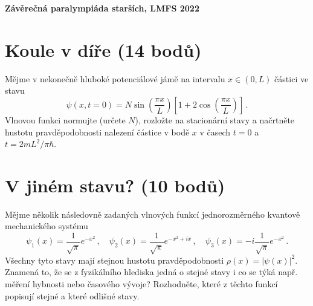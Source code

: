 \documentclass[10pt,a4paper,landscape]{article}
\author{Ondřej Zelenka}
\begin{document}
\pagestyle{empty}
\textbf{\center\LARGE Závěrečná paralympiáda starších, LMFS 2022}

\begin{multicols}{2}[]

\section{Koule v díře (14 bodů)}
Mějme v nekonečně hluboké potenciálové jámě na intervalu $x\in\left(0, L\right)$ částici ve stavu
\begin{equation}
\psi\left(x, t=0\right) = N\sin\left(\frac{\pi x}{L}\right)\left[1 + 2\cos\left(\frac{\pi x}{L}\right)\right] \,.
\end{equation}
Vlnovou funkci normujte (určete $N$), rozložte na stacionární stavy a načrtněte hustotu pravděpodobnosti nalezení částice v bodě $x$ v časech $t = 0$ a $t = 2mL^2/\pi\hbar$.

\section{V jiném stavu? (10 bodů)}
Mějme několik následovně zadaných vlnových funkcí jednorozměrného kvantově mechanického systému
\begin{equation}
\psi_1\left(x\right) = \frac{1}{\sqrt{\pi}}e^{-x^2} \,,\quad \psi_2\left(x\right) = \frac{1}{\sqrt{\pi}}e^{-x^2+ix} \,,\quad \psi_3\left(x\right) = -i\frac{1}{\sqrt{\pi}}e^{-x^2} \,.
\end{equation}
Všechny tyto stavy mají stejnou hustotu pravděpodobnosti $\rho\left(x\right) = \left|\psi\left(x\right)\right|^2$. Znamená to, že se z fyzikálního hlediska jedná o stejné stavy i co se týká např. měření hybnosti nebo časového vývoje? Rozhodněte, které z těchto funkcí popisují stejné a které odlišné stavy.


\end{multicols}
\end{document}
